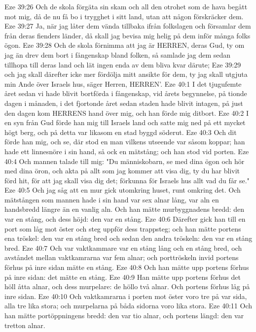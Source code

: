 Eze 39:26  Och de skola förgäta sin skam och all den otrohet som de hava begått mot mig, då de nu få bo i trygghet i sitt land, utan att någon förskräcker dem.
Eze 39:27  Ja, när jag låter dem vända tillbaka ifrån folkslagen och församlar dem från deras fienders länder, då skall jag bevisa mig helig på dem inför många folks ögon.
Eze 39:28  Och de skola förnimma att jag är HERREN, deras Gud, ty om jag än drev dem bort i fångenskap bland folken, så samlade jag dem sedan tillhopa till deras land och lät ingen enda av dem bliva kvar därute;
Eze 39:29  och jag skall därefter icke mer fördölja mitt ansikte för dem, ty jag skall utgjuta min Ande över Israels hus, säger Herren, HERREN'.
Eze 40:1  I det tjugufemte året sedan vi hade blivit bortförda i fångenskap, vid årets begynnelse, på tionde dagen i månaden, i det fjortonde året sedan staden hade blivit intagen, på just den dagen kom HERRENS hand över mig, och han förde mig ditbort.
Eze 40:2  I en syn från Gud förde han mig till Israels land och satte mig ned på ett mycket högt berg, och på detta var likasom en stad byggd söderut.
Eze 40:3  Och dit förde han mig, och se, där stod en man vilkens utseende var såsom koppar; han hade ett linnesnöre i sin hand, så ock en mätstång; och han stod vid porten.
Eze 40:4  Och mannen talade till mig: "Du människobarn, se med dina ögon och hör med dina öron, och akta på allt som jag kommer att visa dig, ty du har blivit förd hit, för att jag skall visa dig det; förkunna för Israels hus allt vad du får se."
Eze 40:5  Och jag såg att en mur gick utomkring huset, runt omkring det. Och mätstången som mannen hade i sin hand var sex alnar lång, var aln en handsbredd längre än en vanlig aln. Och han mätte murbyggnadens bredd: den var en stång, och dess höjd: den var en stång.
Eze 40:6  Därefter gick han till en port som låg mot öster och steg uppför dess trappsteg; och han mätte portens ena tröskel: den var en stång bred och sedan den andra tröskeln: den var en stång bred.
Eze 40:7  Och var vaktkammare var en stång lång och en stång bred, och avståndet mellan vaktkamrarna var fem alnar; och porttröskeln invid portens förhus på inre sidan mätte en stång.
Eze 40:8  Och han mätte upp portens förhus på inre sidan: det mätte en stång.
Eze 40:9  Han mätte upp portens förhus det höll åtta alnar, och dess murpelare: de höllo två alnar. Och portens förhus låg på inre sidan.
Eze 40:10  Och vaktkamrarna i porten mot öster voro tre på var sida, alla tre lika stora; och murpelarna på båda sidorna voro lika stora.
Eze 40:11  Och han mätte portöppningens bredd: den var tio alnar, och portens längd: den var tretton alnar.
